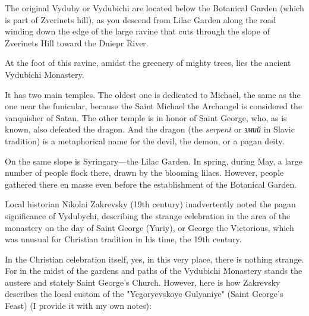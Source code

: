 \documentclass[a5paper,11pt,openany]{article}
\begin{document}
The original Vyduby or Vydubichi are located below the Botanical Garden (which is part of Zverinets hill), as you descend from Lilac Garden along the road winding down the edge of the large ravine that cuts through the slope of Zverinets Hill toward the Dniepr River.

At the foot of this ravine, amidst the greenery of mighty trees, lies the ancient Vydubichi Monastery.

It has two main temples. The oldest one is dedicated to Michael, the same as the one near the funicular, because the Saint Michael the Archangel is considered the vanquisher of Satan. The other temple is in honor of Saint George, who, as is known, also defeated the dragon. And the dragon (the \textit{serpent} or \textit{змий} in Slavic tradition) is a metaphorical name for the devil, the demon, or a pagan deity.

On the same slope is Syringary—the Lilac Garden. In spring, during May, a large number of people flock there, drawn by the blooming lilacs. However, people gathered there en masse even before the establishment of the Botanical Garden.

Local historian Nikolai Zakrevsky (19th century) inadvertently noted the pagan significance of Vydubychi, describing\cite{zakr01} the strange celebration in the area of the monastery on the day of Saint George (Yuriy), or George the Victorious, which was unusual for Christian tradition in his time, the 19th century.

In the Christian celebration itself, yes, in this very place, there is nothing strange. For in the midst of the gardens and paths of the Vydubichi Monastery stands the austere and stately Saint George's Church. However, here is how Zakrevsky describes the local custom of the "Yegoryevskoye Gulyaniye" (Saint George's Feast) (I provide it with my own notes):
\end{document}
